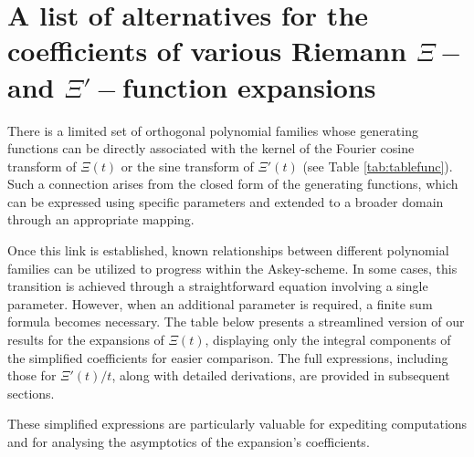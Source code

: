 \documentclass[a4paper,11pt,twoside]{amsart}
\begin{document}
\renewcommand{\theequation}{B.\arabic{equation}}
\setcounter{equation}{0}
\section{A list of alternatives for the coefficients of various Riemann $\Xi-$ and $\Xi'-$function expansions}\label{specexpansions}

There is a limited set of orthogonal polynomial families whose generating functions can be directly associated with the kernel of the Fourier cosine transform of $\Xi(t)$ or the sine transform of $\Xi{\prime}(t)$ (see Table \ref{tab:tablefunc}). Such a connection arises from the closed form of the generating functions, which can be expressed using specific parameters and extended to a broader domain through an appropriate mapping.

Once this link is established, known relationships between different polynomial families can be utilized to progress within the Askey-scheme. In some cases, this transition is achieved through a straightforward equation involving a single parameter. However, when an additional parameter is required, a finite sum formula becomes necessary. The table below presents a streamlined version of our results for the expansions of $\Xi(t)$, displaying only the integral components of the simplified coefficients for easier comparison. The full expressions, including those for $\Xi'(t)/t$, along with detailed derivations, are provided in subsequent sections. 

These simplified expressions are particularly valuable for expediting computations and for analysing the asymptotics of the expansion's coefficients.
\end{document}
